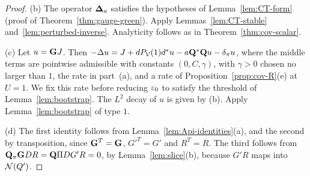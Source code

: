 \begin{proof}
(b) The operator $\boldsymbol{\Delta}_a$ satisfies the hypotheses of Lemma~\ref{lem:CT-form} (proof of Theorem~\ref{thm:gauge-green}). Apply Lemmas~\ref{lem:CT-stable} and~\ref{lem:perturbed-inverse}. Analyticity follows as in Theorem~\ref{thm:cov-scalar}.

(c) Let $u=\mathbf G J$. Then $-\Delta u=J+dP_\mathcal V(1)d^*u-a\mathbf Q^*\mathbf Q u-\delta_\pi u$, where the middle terms are pointwise admissible with constants $(0,C,\gamma)$, with $\gamma>0$ chosen no larger than $1$, the rate in part~(a), and a rate of Proposition~\ref{prop:cov-R}(e) at $U=1$. We fix this rate before reducing $\varepsilon_0$ to satisfy the threshold of Lemma~\ref{lem:bootstrap}. The $L^2$ decay of $u$ is given by (b). Apply Lemma~\ref{lem:bootstrap} of type $1$.

(d) The first identity follows from Lemma~\ref{lem:Api-identities}(a), and the second by transposition, since $\mathbf G^T=\mathbf G$, $G'^T=G'$ and $R^T=R$. The third follows from $\mathbf Q_\pi\mathbf G DR=\mathbf Q\Pi DG'R=0$, by Lemma~\ref{lem:slice}(b), because $G'R$ maps into $\mathcal N(Q')$.
\end{proof}
